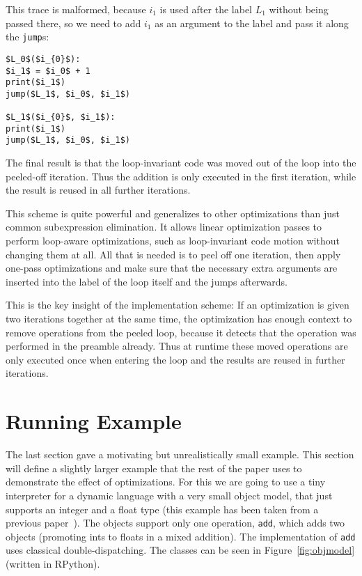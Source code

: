 \documentclass[preprint]{sigplanconf}
\let\oldcite=\cite
\renewcommand\cite[1]{\ifthenelse{\equal{#1}{XXX}}{[citation~needed]}{\oldcite{#1}}}
\begin{document}
This trace is malformed, because $i_1$ is used after the label $L_1$ without
being passed there, so we need to add $i_1$ as an argument to the label and pass
it along the \lstinline{jump}s:

\begin{lstlisting}[mathescape,numbers = right,basicstyle=\setstretch{1.05}\ttfamily\scriptsize]
$L_0$($i_{0}$):
$i_1$ = $i_0$ + 1
print($i_1$)
jump($L_1$, $i_0$, $i_1$)

$L_1$($i_{0}$, $i_1$):
print($i_1$)
jump($L_1$, $i_0$, $i_1$)
\end{lstlisting}

The final result is that the loop-invariant code was moved out of the loop into
the peeled-off iteration. Thus the addition is only executed in the first
iteration, while the result is reused in all further iterations.

This scheme is quite powerful and generalizes to other optimizations than just
common subexpression elimination. It allows linear optimization passes to
perform loop-aware optimizations, such as loop-invariant code motion without
changing them at all. All that is needed is to peel off one iteration, then
apply one-pass optimizations and make sure that the necessary extra
arguments are inserted into the label of the loop itself and the jumps
afterwards.

This is the key insight of the implementation scheme: If an
optimization is given two iterations together at the same time, the
optimization has enough context to remove operations from the peeled loop,
because it detects
that the operation was performed in the preamble already. Thus at runtime these
moved operations are only executed once when entering the loop and the results
are reused in further iterations.



\section{Running Example}
\label{sub:example}

The last section gave a motivating but unrealistically small example.
This section will define a slightly larger example that the rest of the paper
uses to demonstrate the effect of optimizations.
For this we are going to use a tiny interpreter for a dynamic language with
 a very small object
model, that just supports an integer and a float type (this example has been taken from a previous paper~\cite{bolz_allocation_2011}). The objects support only
one operation, \lstinline{add}, which adds two objects (promoting ints to floats in a
mixed addition). The implementation of \lstinline{add} uses classical
double-dispatching.
The classes can be seen in
Figure~\ref{fig:objmodel} (written in RPython).
\end{document}
